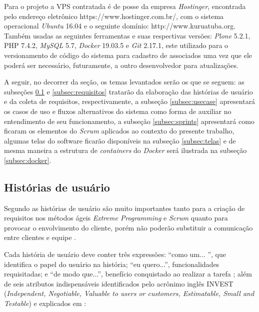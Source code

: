 Para o projeto a VPS contratada é de posse da empresa \textit{Hostinger}, encontrada pelo endereço eletrônico \textsf{https://www.hostinger.com.br/}, com o sistema operacional \textit{Ubuntu} 16.04 e o seguinte domínio: \textsf{http://www.kuruatuba.org}. Também usadas as seguintes ferramentas e suas respectivas versões: \textit{Plone} 5.2.1, PHP 7.4.2, \textit{MySQL} 5.7, \textit{Docker} 19.03.5 e \textit{Git} 2.17.1, este utilizado para o versionamento de código do sistema para cadastro de associados uma vez que ele poderá ser necessário, futuramente, a outro desenvolvedor para atualizações. 

A seguir, no decorrer da seção, os temas levantados serão os que se seguem: as subseções \ref{subsec:historias} e \ref{subsec:requisitos} tratarão da elaboração das histórias de usuário e da coleta de requisitos, respectivamente, a subseção \ref{subsec:usecase} apresentará os casos de uso e fluxos alternativos do sistema como forma de auxiliar no entendimento de seu funcionamento, a subseção \ref{subsec:sprints} apresentará como ficaram os elementos do \textit{Scrum} aplicados ao contexto do presente trabalho, algumas telas do software ficarão disponíveis na subseção \ref{subsec:telas} e de mesma maneira a estrutura de \textit{containers} do \textit{Docker} será ilustrada na subseção \ref{subsec:docker}.

\hspace{2.5cm}
\subsection{Histórias de usuário}
\label{subsec:historias}
\hspace{2.5cm}

Segundo  as histórias de usuário são muito importantes tanto para a criação de requisitos nos métodos ágeis \textit{Extreme Programming} e \textit{Scrum} quanto para provocar o envolvimento do cliente, porém não poderão substituir a comunicação entre clientes e equipe .

Cada história de usuário deve conter três expressões: ``como um... '', que identifica o papel do usuário na história; ``eu quero...'', funcionalidades requisitadas; e ``de modo que...'', benefício conquistado ao realizar a tarefa ; além de seis atributos indispensáveis identificados pelo acrônimo inglês INVEST (\textit{Independent, Negotiable, Valuable to users or customers, Estimatable, Small and Testable}) \cite{cohn2004user} e explicados em :

